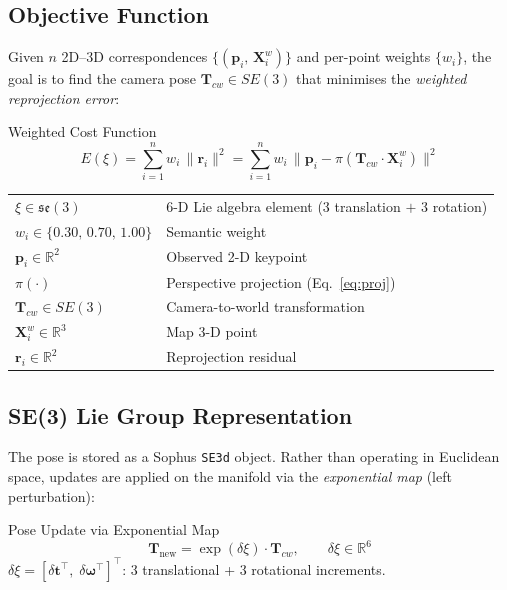 \documentclass[12pt,a4paper]{article}
\begin{document}
\subsection{Objective Function}

Given $n$ 2D--3D correspondences $\{(\mathbf{p}_i,\,\mathbf{X}^w_i)\}$ and
per-point weights $\{w_i\}$, the goal is to find the camera pose
$\mathbf{T}_{cw} \in SE(3)$ that minimises the \emph{weighted reprojection error}:

\begin{formulabox}{Weighted Cost Function}
\begin{equation}
  E(\xi) = \sum_{i=1}^{n} w_i\,\|\mathbf{r}_i\|^2
         = \sum_{i=1}^{n} w_i\,\bigl\|\mathbf{p}_i - \pi\!\left(
             \mathbf{T}_{cw} \cdot \mathbf{X}^w_i\right)\bigr\|^2
  \label{eq:cost}
\end{equation}
\vspace{2pt}
\begin{tabular}{ll}
  $\xi \in \mathfrak{se}(3)$ & 6-D Lie algebra element (3 translation $+$ 3 rotation) \\
  $w_i \in \{0.30,\,0.70,\,1.00\}$ & Semantic weight \\
  $\mathbf{p}_i \in \mathbb{R}^2$ & Observed 2-D keypoint \\
  $\pi(\cdot)$ & Perspective projection (Eq.~\ref{eq:proj}) \\
  $\mathbf{T}_{cw} \in SE(3)$ & Camera-to-world transformation \\
  $\mathbf{X}^w_i \in \mathbb{R}^3$ & Map 3-D point \\
  $\mathbf{r}_i \in \mathbb{R}^2$ & Reprojection residual \\
\end{tabular}
\end{formulabox}

\subsection{SE(3) Lie Group Representation}

The pose is stored as a Sophus \texttt{SE3d} object. Rather than operating in
Euclidean space, updates are applied on the manifold via the \emph{exponential map}
(left perturbation):

\begin{formulabox}{Pose Update via Exponential Map}
\begin{equation}
  \mathbf{T}_{\text{new}} = \exp(\delta\xi)\cdot\mathbf{T}_{cw}, \qquad
  \delta\xi \in \mathbb{R}^6
  \label{eq:expmap}
\end{equation}
$\delta\xi = [\delta\mathbf{t}^\top,\;\delta\boldsymbol{\omega}^\top]^\top$:
3 translational + 3 rotational increments.
\end{formulabox}
\end{document}
